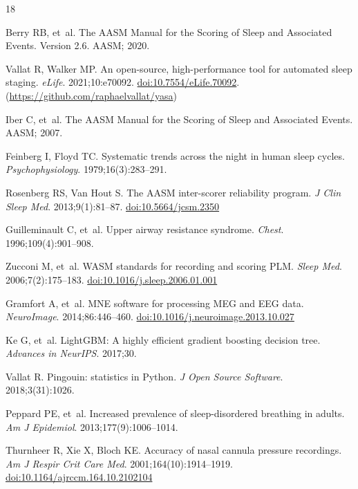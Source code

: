 \documentclass[11pt,a4paper,twocolumn]{article}
\begin{document}
\begin{thebibliography}{18}

Berry RB, et~al. The AASM Manual for the Scoring of Sleep and Associated Events. Version 2.6. AASM; 2020.

Vallat R, Walker MP. An open-source, high-performance tool for automated sleep staging. \emph{eLife}. 2021;10:e70092. \href{https://doi.org/10.7554/eLife.70092}{doi:10.7554/eLife.70092}. (\url{https://github.com/raphaelvallat/yasa})

Iber C, et~al. The AASM Manual for the Scoring of Sleep and Associated Events. AASM; 2007.

Feinberg I, Floyd TC. Systematic trends across the night in human sleep cycles. \emph{Psychophysiology}. 1979;16(3):283--291.

Rosenberg RS, Van Hout S. The AASM inter-scorer reliability program. \emph{J Clin Sleep Med}. 2013;9(1):81--87. \href{https://doi.org/10.5664/jcsm.2350}{doi:10.5664/jcsm.2350}

Guilleminault C, et~al. Upper airway resistance syndrome. \emph{Chest}. 1996;109(4):901--908.

Zucconi M, et~al. WASM standards for recording and scoring PLM. \emph{Sleep Med}. 2006;7(2):175--183. \href{https://doi.org/10.1016/j.sleep.2006.01.001}{doi:10.1016/j.sleep.2006.01.001}

Gramfort A, et~al. MNE software for processing MEG and EEG data. \emph{NeuroImage}. 2014;86:446--460. \href{https://doi.org/10.1016/j.neuroimage.2013.10.027}{doi:10.1016/j.neuroimage.2013.10.027}

Ke G, et~al. LightGBM: A highly efficient gradient boosting decision tree. \emph{Advances in NeurIPS}. 2017;30.

Vallat R. Pingouin: statistics in Python. \emph{J Open Source Software}. 2018;3(31):1026.

Peppard PE, et~al. Increased prevalence of sleep-disordered breathing in adults. \emph{Am J Epidemiol}. 2013;177(9):1006--1014.

Thurnheer R, Xie X, Bloch KE. Accuracy of nasal cannula pressure recordings. \emph{Am J Respir Crit Care Med}. 2001;164(10):1914--1919. \href{https://doi.org/10.1164/ajrccm.164.10.2102104}{doi:10.1164/ajrccm.164.10.2102104}


\end{thebibliography}
\end{document}
